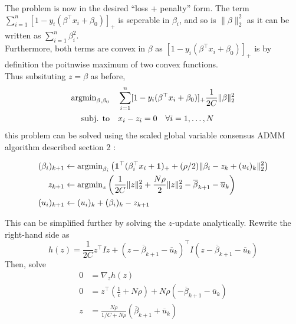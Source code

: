 \documentclass[11pt]{article}
\begin{document}
The problem is now in the desired ``loss + penalty'' form. The term $\sum_{i=1}^n [1 - y_i (\beta^\top x_i + \beta_0)]_+$  is seperable in $\beta_i$, and so is $\| \beta \|_2^2$ as it can be written as
$\sum_{i=1}^n \beta_i^2$. \\
Furthermore, both terms are convex in $\beta$ as $[1 - y_i (\beta^\top x_i + \beta_0)]_+$ is by definition the poitnwise maximum of two convex functions. \\

Thus subsituting $z = \beta$ as before, 
\begin{equation} 
\begin{aligned}
\operatorname{argmin}_{\beta, \beta_0} \quad 
&  \sum_{i=1}^n [1 - y_i (\beta^\top x_i + \beta_0)]_+ \frac{1}{2C} \|\beta\|_2^2 \\
\textrm{subj. to} \quad & x_i - z_i = 0 \quad \forall i = 1, \ldots, N
\end{aligned}
\end{equation}
this problem can be solved using the scaled global
variable consensus ADMM algorithm described section 2 \cite{boydistributed}:

\begin{equation*}
\begin{aligned}
    (\beta_i)_{k+1} & \leftarrow \operatorname{argmin}_{\beta_i} \left(\mathbf{1}^\top(\beta_i^\top x_i + \mathbf{1})_+ + (\rho/2) \|\beta_i - z_k + (u_i)_k \|_2^2 \right) \\
    z_{k+1} & \leftarrow  \operatorname{argmin}_z \left( \frac{1}{2C} \|z\|_2^2 + \frac{N \rho}{2} \|z\|_2^2  - \overline{\beta}_{k+1} - \overline{u}_k\right) \\
    (u_i)_{k+1} & \leftarrow (u_i)_k + (\beta_i)_k - z_{k+1}
\end{aligned}
\end{equation*}

This can be simplified further by solving the $z$-update analytically. Rewrite the right-hand 
side as 
\[
    h(z) = \frac{1}{2C} z^\top I z + (z - \overline{\beta}_{k+1} - \overline{u}_k)^\top I (z - \overline{\beta}_{k+1} - \overline{u}_k)
\]
Then, solve 
\begin{align*}
    0 &= \nabla_z h(z)  \\
    0 &= z^\top \left(\frac{1}{c} + N\rho \right) + N\rho \left(- \overline{\beta}_{k+1} - \overline{u}_k \right) \\
    z &= \frac{N \rho}{1/C + N\rho} \left( \overline{\beta}_{k+1} + \overline{u}_k \right)
\end{align*}
\end{document}
